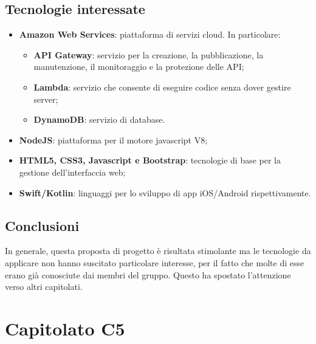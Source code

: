 \documentclass[11pt,a4paper]{article}
\begin{document}
\subsection{Tecnologie interessate}
\begin{itemize}
\item \textbf{Amazon Web Services}: piattaforma di servizi cloud. In particolare:
	\begin{itemize}
	\item \textbf{API Gateway}: servizio per la creazione, la pubblicazione, la manutenzione, il monitoraggio e la protezione delle API;
	\item \textbf{Lambda}: servizio che consente di eseguire codice senza dover gestire server;
	\item  \textbf{DynamoDB}: servizio di database.
	\end{itemize}
\item \textbf{NodeJS}: piattaforma per il motore javascript V8;
\item \textbf{HTML5, CSS3, Javascript e Bootstrap}: tecnologie di base per la gestione dell'interfaccia web;
\item \textbf{Swift/Kotlin}: linguaggi per lo sviluppo di app iOS/Android rispettivamente.
\end{itemize}
\subsection{Conclusioni}
In generale, questa proposta di progetto è risultata stimolante ma le tecnologie da applicare non hanno suscitato particolare interesse, per il fatto che molte di esse erano già conosciute dai membri del gruppo. Questo ha spostato l'attenzione verso altri capitolati.
\newpage
\section{Capitolato C5}
\end{document}
